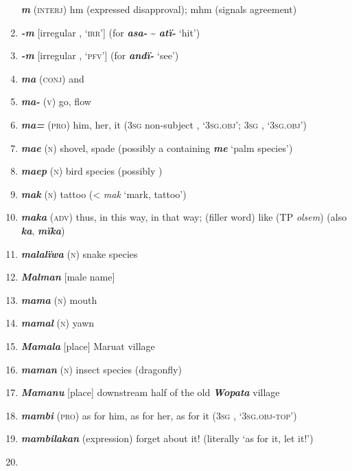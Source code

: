 \begin{enumerate}[noitemsep, label={}, align=left, widest=190, labelsep=1ex,leftmargin=*,itemindent=-10pt]
\textbf{\textit{m}} (\textsc{interj}) hm (expressed disapproval); mhm (signals agreement) \item 
\textbf{\textit{-m}} [irregular  , ‘\textsc{irr}’] (for \textbf{\textit{asa-}} {\textasciitilde} \textbf{\textit{atï-}} ‘hit’) \item 
\textbf{\textit{-m}} [irregular  , ‘\textsc{pfv}’] (for \textbf{\textit{andï-}} ‘see’) \item 
\textbf{\textit{ma}} (\textsc{conj}) and \item 
\textbf{\textit{ma-}} (\textsc{v}) go, flow \item 
\textbf{\textit{ma=}} (\textsc{pro}) him, her, it (3\textsc{sg} non-subject , ‘\textsc{3sg.obj}’; 3\textsc{sg} , ‘\textsc{3sg.obj}’) \item 
\textbf{\textit{mae}} (\textsc{n}) shovel, spade (possibly a  containing \textbf{\textit{me}} ‘palm species’) \item 
\textbf{\textit{maep}} (\textsc{n}) bird species (possibly ) \item 
\textbf{\textit{mak}} (\textsc{n}) tattoo (<  \textit{mak} ‘mark, tattoo’) \item 
\textbf{\textit{maka}} (\textsc{adv)} thus, in this way, in that way; (filler word) like (TP \textit{olsem}) (also \textbf{\textit{ka}}, \textbf{\textit{mïka}}) \item 
\textbf{\textit{malalïwa}} (\textsc{n}) snake species \item 
\textbf{\textit{Malman}} [male name] \item 
\textbf{\textit{mama}} (\textsc{n}) mouth \item 
\textbf{\textit{mamal}} (\textsc{n}) yawn \item 
\textbf{\textit{Mamala}} [place] Maruat village \item 
\textbf{\textit{maman}} (\textsc{n}) insect species (dragonfly) \item 
\textbf{\textit{Mamanu}} [place] downstream half of the old \textbf{\textit{Wopata}} village \item 
\textbf{\textit{mambi}} (\textsc{pro}) as for him, as for her, as for it (3\textsc{sg} , \linebreak‘\textsc{3sg.obj-top}’) \item 
\textbf{\textit{mambilakan}} (expression) forget about it! (literally ‘as for it, let it!’) \item 

\end{enumerate}
